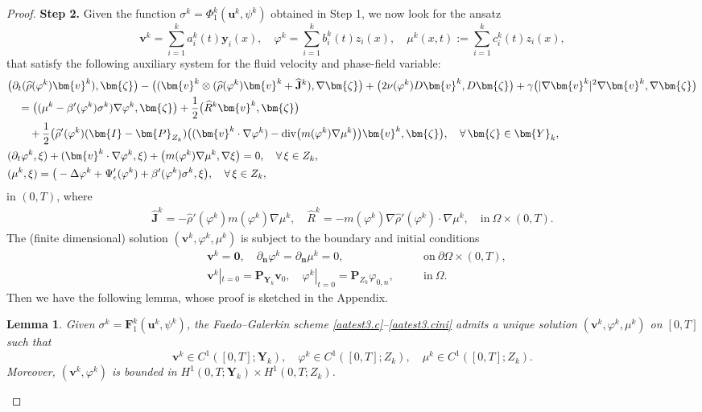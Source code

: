 \documentclass[11pt,reqno]{amsart}
\newtheorem{lemma}{\textbf{Lemma}}[section]
\def\be{\begin{equation}}
\def\ee{\end{equation}}
\def\bl{\begin{lemma}}
\def\el{\end{lemma}}
\def\div{\mathrm{div}}
\def\J{\mathbf{J}}
\def\vv{\bm{v}}
\begin{document}
\begin{proof}
\textbf{Step 2.} Given the function $\sigma^{k}=\Phi^k_{1}(\bm{u}^k,\psi^k)$ obtained in Step 1, we now look for the ansatz
\be
\bm{v}^k=\sum_{i=1}^{k}a_{i}^{k}(t)\bm{y}_{i}(x),\quad \varphi^k=\sum_{i=1}^{k}b_{i}^{k}(t)z_{i}(x),\quad  \mu^{k}(x,t):=\sum_{i=1}^{k}c_{i}^{k}(t)z_{i}(x),
\nonumber
\ee
that satisfy the following auxiliary system for the fluid velocity and phase-field variable:
%
\begin{align}
	& \big(\partial_t (\widehat{\rho}(\varphi^k) \bm{v}^k),\bm{\zeta}\big)
	- \big( ( \bm{v}^k\otimes (\widehat{\rho}(\varphi^k)\bm{v}^k + \widehat{\J}^k),\nabla \bm{ \zeta}\big)
    +\big(  2\nu(\varphi^{k}) D\bm{v}^k, D\bm{\zeta}\big)
    +\gamma \big(|\nabla\vv^k|^2\nabla\vv^k,\nabla \bm{\zeta}\big)
    \notag \\
&\quad =\big((\mu^{k}-\beta'(\varphi^k)\sigma^{k})\nabla \varphi^{k},\bm {\zeta}\big)+ \frac12 \big(\widehat{R}^k\vv^k,\bm{\zeta}\big)
\notag\\
&\qquad + \frac12\big(\widehat{\rho}'(\varphi^k)(\bm{I}-\bm{P}_{Z_{k}}) \big((\bm{v}^k\cdot\nabla\varphi^k)-\div \big(m(\varphi^k)\nabla \mu^k\big)\big)\bm{v}^k,\bm{\zeta}\big),
\quad \forall\, \bm{\zeta} \in \bm{Y}_{k},
	\label{aatest3.c}\\
	&  (\partial_t  \varphi^{k},\xi)+( \bm{v}^{k} \cdot \nabla  \varphi^{k},\xi) +\big(m(\varphi^k)\nabla \mu^{k},\nabla \xi\big)
=0, \quad \forall\, \xi\in Z_{k},
\label{g1.a}\\
& (\mu^k,\xi)
=\big(- \Delta \varphi^k + \Psi'_{\epsilon}(\varphi^k)+\beta'(\varphi^k) \sigma^k, \xi\big),
\quad \forall\, \xi\in Z_{k},
\label{g4.d}
\end{align}
 in $(0,T)$,
where
\begin{align}
\label{atest.1c}
\widehat{\J}^k= -\widehat{\rho}'(\varphi^k) m(\varphi^k) \nabla \mu^k,\quad
\widehat{R}^k= -m(\varphi^k)\nabla \widehat{\rho}'(\varphi^k)\cdot \nabla \mu^k,\quad \text{in}\ \Omega\times(0,T).
\end{align}
%
The (finite dimensional) solution $(\bm{v}^k,\varphi^k,\mu^k)$
is subject to the boundary and initial conditions
%
\begin{align}
 & \bm{v}^k=\bm{0},\quad \partial_{\bm{n}}\varphi^k=\partial_{\boldsymbol{n}} \mu^k=0,&&\quad \textrm{on}\ \partial\Omega\times(0,T),
\label{aatest.boundary1}
\\
& \bm{v}^{k}|_{t=0}=\bm{P}_{\bm{Y}_{k}} \bm{v}_{0},\quad \varphi^{k}|_{t=0}=\bm{P}_{Z_{k}}\varphi_{0,n},&&\quad \text{in}\ \Omega.
\label{aatest3.cini}
\end{align}
%
Then we have the following lemma, whose proof is sketched in the Appendix.
%
\bl\label{NSSa}
Given $\sigma^k=\mathbf{F}^k_{1}(\bm{u}^k,\psi^k)$, the Faedo--Galerkin scheme \eqref{aatest3.c}--\eqref{aatest3.cini} admits a unique solution   $(\bm{v}^k,\varphi^k,\mu^k)$ on $[0,T]$ such that
$$
\bm{v}^k\in C^1([0,T];\bm{Y}_{k}),\quad
\varphi^k \in C^1([0,T];Z_{k}),\quad
\mu^k\in C^1([0,T];Z_{k}).
$$
Moreover, $(\bm{v}^k,\varphi^k)$ is bounded in $H^1(0,T;\bm{Y}_{k})\times H^1(0,T;Z_{k})$.
\el



\end{proof}
\end{document}
